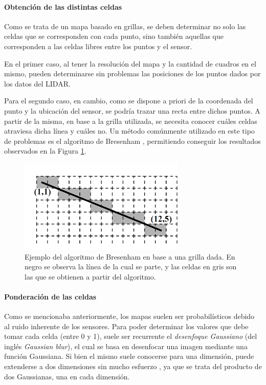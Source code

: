 \paragraph{Obtención de las distintas celdas}
Como se trata de un mapa basado en grillas, se deben determinar no solo las celdas que se corresponden con cada punto, sino también aquellas que corresponden a las celdas libres entre los puntos y el sensor.

En el primer caso, al tener la resolución del mapa y la cantidad de cuadros en el mismo, pueden determinarse sin problemas las posiciones de los puntos dados por los datos del LIDAR. 

Para el segundo caso, en cambio, como se dispone a priori de la coordenada del punto y la ubicación del sensor, se podría trazar una recta entre dichos puntos. A partir de la misma, en base a la grilla utilizada, se necesita conocer cuáles celdas atraviesa dicha línea y cuáles no. Un método comúnmente utilizado en este tipo de problemas es el algoritmo de Bresenham \cite{bresenham1965}, permitiendo conseguir los resultados observados en la Figura \ref{fig:bresenhamlinealgorithm}.

\begin{figure}[!ht]
    \centering
    \includegraphics[width=0.9\linewidth]{Img/BresenhamLineAlgorithm.png}
    \caption{Ejemplo del algoritmo de Bresenham en base a una grilla dada. En negro se observa la línea de la cual se parte, y las celdas en gris son las que se obtienen a partir del algoritmo.}
    \label{fig:bresenhamlinealgorithm}
\end{figure}

\paragraph{Ponderación de las celdas}
Como se mencionaba anteriormente, los mapas suelen ser probabilísticos debido al ruido inherente de los sensores. Para poder determinar los valores que debe tomar cada celda (entre 0 y 1), suele ser recurrente el \textit{desenfoque Gaussiano} (del inglés \textit{Gaussian blur}), el cual se basa en desenfocar una imagen mediante una función Gaussiana. Si bien el mismo suele conocerse para una dimensión, puede extenderse a dos dimensiones sin mucho esfuerzo \cite{haddad1991}, ya que se trata del producto de dos Gaussianas, una en cada dimensión.

